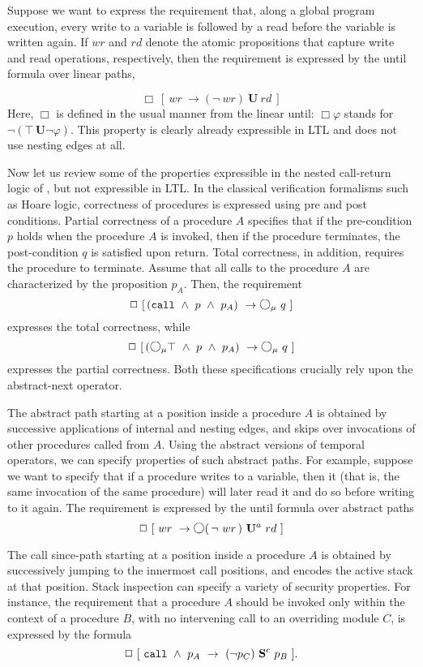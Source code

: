 \documentclass{LMCS}
\newcommand{\M}{{\mu}}
\newcommand{\dm}{\Diamond}
\newcommand{\U}{{\mathbf U}}
\renewcommand{\S}{{\mathbf S}}
\newcommand{\next}{\text{\raisebox{1pt}{$\bigcirc$}}}
\renewcommand{\phi}{\varphi}
\theoremstyle{plain}
\theoremstyle{definition}
\newcommand{\Sc}{\S^c}
\newcommand{\Ur}{\U^a}
\newcommand{\always}{\Box}
\newcommand{\until}{\U}
\newcommand{\caret}{\text{CaRet}}
\newcommand{\call}{{\tt call}}
\newcommand{\dmm}{\dm_{\M}}
\renewcommand{\dm}{\next}
\renewcommand{\dmm}{\dm_\M}
\newcounter{example}
\begin{document}
Suppose we want to express the requirement that, along a global
program execution, every write to a variable is followed by a read
before the variable is written again.  If $wr$ and $rd$ denote the
atomic propositions that capture write and read operations,
respectively, then the requirement is expressed by the until formula
over linear paths,

 \[ \always\ [\ wr\ \rightarrow (\neg\ wr)\ \until\
rd\ ]\] Here, $\always$ is defined in the usual manner from the linear
until: $\always\phi$ stands for $\neg(\top\,\until\neg\phi)$.  This
property is clearly already expressible in LTL and does not use nesting
edges at all.

Now let us review some of the properties expressible in the nested
call-return logic \caret{} of \cite{AEM04}, but
not expressible in LTL.  In the classical verification
formalisms such as Hoare logic, correctness of procedures is expressed
using pre and post conditions.  Partial correctness of a procedure $A$
specifies that if the pre-condition $p$ holds when the procedure $A$
is invoked, then if the procedure terminates, the post-condition $q$
is satisfied upon return. Total correctness, in addition, requires the
procedure to terminate.  Assume that all calls to the procedure $A$
are characterized by the proposition $p_A$. Then, the requirement
\[\always\ [\, (\call\ \wedge\ p\ \wedge\ p_A)\ \rightarrow \dmm\ q\
]\] expresses the total correctness, while \[ \always\ [\, (\dmm\top\
\wedge\ p\ \wedge\ p_A)\ \rightarrow \dmm\ q\ ]\] expresses the
partial correctness.  Both these specifications crucially rely upon
the abstract-next operator.

The abstract path starting at a position inside a procedure $A$ is
obtained by successive applications of internal and nesting edges,
 and skips over invocations of
other procedures called from $A$. 
Using the abstract versions of temporal operators, we 
 can specify properties of such
abstract paths. For example, suppose we want to specify that
if a procedure writes to a variable, then it (that is, the same 
invocation of the same procedure) will later read it and do so before writing to it again.
The requirement is expressed by the
until formula over abstract paths
\[ \always\ [\ wr\ \rightarrow \dm (\, \neg\ wr\,)\ \Ur\ rd\ ]\]

The call since-path starting at a position inside a procedure $A$ is
obtained by successively jumping to the innermost call positions, and
encodes the active stack at that position.  Stack inspection can
specify a variety of security properties. For instance, the
requirement that a procedure $A$ should be invoked only within the
context of a procedure $B$, with no intervening call to an overriding
module $C$, is expressed by the formula \[ \always\ [\ \call\ \wedge\
p_A\ \rightarrow\ (\neg p_C)\ \Sc\ p_B\ ].\]
\end{document}
